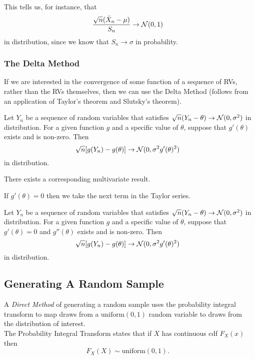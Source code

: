 \begin{remark}
    This tells us, for instance, that 
    \[
        \frac{\sqrt{n}(\bar{X}_n - \mu)}{S_n} \to \mathcal{N}(0, 1)
    \]
    in distribution, since we know that $S_n \to \sigma$ in probability.
\end{remark}

\subsubsection{The Delta Method}
If we are interested in the convergence of some function of a sequence of RVs, rather than the RVs themselves, then we can use the Delta Method (follows from an application of Taylor's theorem and Slutsky's theorem).

\begin{theorem}
    Let $Y_n$ be a sequence of random variables that satisfies $\sqrt{n}(Y_n - \theta) \to \mathcal{N}(0, \sigma^2)$ in distribution. For a given function $g$ and a specific value of $\theta$, suppose that $g'(\theta)$ exists and is non-zero. Then
    \[
        \sqrt{n}[g(Y_n) - g(\theta)] \to \mathcal{N}(0, \sigma^2g'(\theta)^2)
    \]
    in distribution.
\end{theorem}


\begin{remark}
    There exists a corresponding multivariate result.
\end{remark}

If $g'(\theta) = 0$ then we take the next term in the Taylor series.

\begin{theorem}
    Let $Y_n$ be a sequence of random variables that satisfies $\sqrt{n}(Y_n - \theta) \to \mathcal{N}(0, \sigma^2)$ in distribution. For a given function $g$ and a specific value of $\theta$, suppose that $g'(\theta) = 0$ and $g''(\theta)$ exists and is non-zero. Then
    \[
        \sqrt{n}[g(Y_n) - g(\theta)] \to \mathcal{N}(0, \sigma^2g'(\theta)^2)
    \]
    in distribution.
\end{theorem}


\subsection{Generating A Random Sample}

\begin{definition}
    A \emph{Direct Method} of generating a random sample uses the probability integral transform to map draws from a $\text{uniform}(0, 1)$ random variable to draws from the distribution of interest.\\
    
    The Probability Integral Transform states that if $X$ has continuous cdf $F_X(x)$ then
    \[
        F_X(X) \sim \text{uniform}(0, 1).
    \]
\end{definition}

